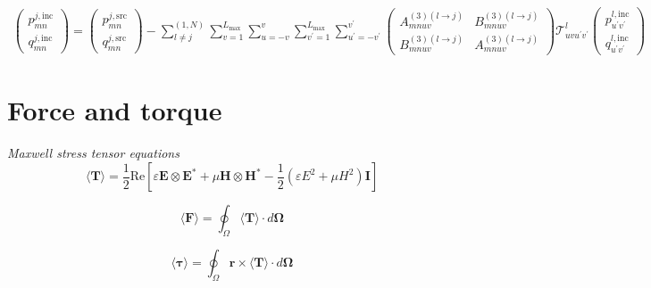 \documentclass[11pt]{article}
\begin{document}
\begin{align}
    \begin{pmatrix}
        p_{mn}^{j,\text{inc}} \\[6pt]
        q_{mn}^{j,\text{inc}} 
    \end{pmatrix}
    = 
    \begin{pmatrix}
        p_{mn}^{j,\text{src}} \\[6pt]
        q_{mn}^{j,\text{src}} 
    \end{pmatrix}
    -
    \sum_{l \neq j}^{(1,N)}\sum_{v=1}^{L_\text{max}} \sum_{u=-v}^{v}
    \sum_{v^\prime=1}^{L_\text{max}} \sum_{u^\prime=-v^\prime}^{v^\prime}
    \begin{pmatrix}
        A_{mnuv}^{(3)(l \rightarrow j)} & B_{mnuv}^{(3)(l \rightarrow j)} \\[6pt] 
        B_{mnuv}^{(3)(l \rightarrow j)} & A_{mnuv}^{(3)(l \rightarrow j)}
    \end{pmatrix}
    \mathcal{T}_{uvu^\prime v^\prime}^l
    \begin{pmatrix}
        p_{u^\prime v^\prime}^{l,\text{inc}} \\[6pt]
        q_{u^\prime v^\prime}^{l,\text{inc}}
    \end{pmatrix}
\label{eqn:gmt_system}
\end{align}

\section{Force and torque}
\emph{Maxwell stress tensor equations}
\begin{equation}
    \langle \boldsymbol{T} \rangle = \frac{1}{2} \text{Re} \left[ \varepsilon  \boldsymbol{E} \otimes \boldsymbol{E^*} + \mu \boldsymbol{H} \otimes \boldsymbol{H^*}
    - \frac{1}{2}(\varepsilon E^2 + \mu H^2)\boldsymbol{I} \right]
\end{equation}

\begin{equation}
    \langle \boldsymbol{F} \rangle = \oint_\Omega \langle \boldsymbol{T} \rangle \cdot d \boldsymbol{\Omega}
\end{equation}

\begin{equation}
    \langle \boldsymbol{\tau} \rangle = \oint_\Omega \boldsymbol{r} \times \langle \boldsymbol{T}  \rangle \cdot d \boldsymbol{\Omega}
\end{equation}
\end{document}
